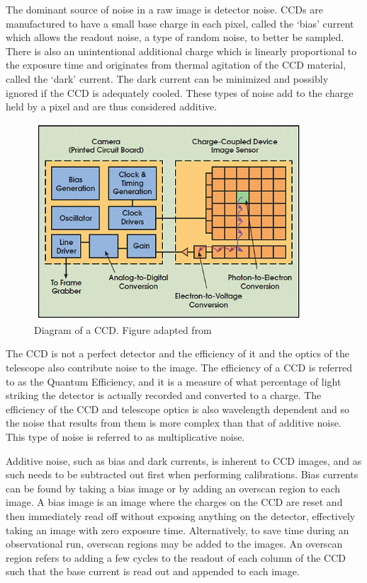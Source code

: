 The dominant source of noise in a raw image is detector noise. \glspl{CCD} are manufactured to have a small base charge in each pixel, called the `bias' current which allows the readout noise, a type of random noise, to better be sampled. There is also an unintentional additional charge which is linearly proportional to the exposure time and originates from thermal agitation of the \gls{CCD} material, called the `dark' current. The dark current can be minimized and possibly ignored if the \gls{CCD} is adequately cooled. These types of noise add to the charge held by a pixel and are thus considered additive.
\prgph

\begin{figure}[t]
  \centering
  \includegraphics[width = 10cm]{figures/2_ccd.jpg}
  \caption{Diagram of a \gls{CCD}. Figure adapted from \citep{ccd_fig}}
  \label{fig:ccd_diagram}
\end{figure}


The \gls{CCD} is not a perfect detector and the efficiency of it and the optics of the telescope also contribute noise to the image. The efficiency of a \gls{CCD} is referred to as the Quantum Efficiency, and it is a measure of what percentage of light striking the detector is actually recorded and converted to a charge. The efficiency of the \gls{CCD} and telescope optics is also wavelength dependent and so the noise that results from them is more complex than that of additive noise. This type of noise is referred to as multiplicative noise.
\prgph

Additive noise, such as bias and dark currents, is inherent to \gls{CCD} images, and as such needs to be subtracted out first when performing calibrations. Bias currents can be found by taking a bias image or by adding an overscan region to each image. A bias image is an image where the charges on the \gls{CCD} are reset and then immediately read off without exposing anything on the detector, effectively taking an image with zero exposure time. Alternatively, to save time during an observational run, overscan regions may be added to the images. An overscan region refers to adding a few cycles to the readout of each column of the \gls{CCD} such that the base current is read out and appended to each image.
\prgph


